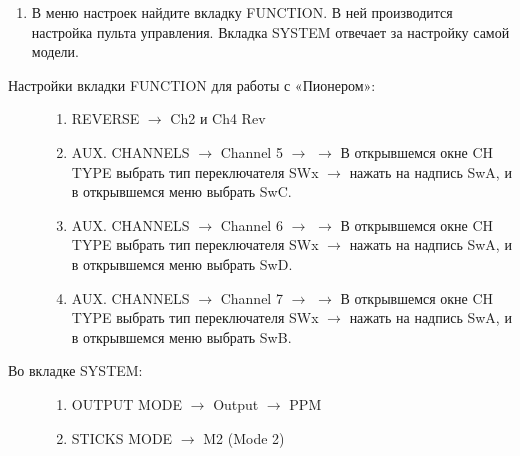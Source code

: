 \documentclass[a4paper,10pt,russian]{sphinxmanual}
\begin{document}
\noindent{}
\begin{enumerate}
\def\theenumi{\arabic{enumi}}
\def\labelenumi{\theenumi .}
\makeatletter\def\p@enumii{\p@enumi \theenumi .}\makeatother
\setcounter{enumi}{3}
\item {} 
В меню настроек найдите вкладку FUNCTION. В ней производится настройка пульта управления. Вкладка SYSTEM отвечает за настройку самой модели.

\end{enumerate}
\begin{description}
\item[{Настройки вкладки FUNCTION для работы с «Пионером»:}] \leavevmode\begin{enumerate}
\def\theenumi{\arabic{enumi}}
\def\labelenumi{\theenumi .}
\makeatletter\def\p@enumii{\p@enumi \theenumi .}\makeatother
\item {} 
REVERSE \(\rightarrow\) Ch2 и Ch4 \textendash{}Rev

\item {} 
AUX. CHANNELS \(\rightarrow\) Channel 5 \(\rightarrow\) \(\rightarrow\) В открывшемся окне CH TYPE выбрать тип переключателя SWx \(\rightarrow\) нажать на надпись SwA, и в открывшемся меню выбрать SwC.

\item {} 
AUX. CHANNELS \(\rightarrow\) Channel 6 \(\rightarrow\) \(\rightarrow\) В открывшемся окне CH TYPE выбрать тип переключателя SWx \(\rightarrow\) нажать на надпись SwA, и в открывшемся меню выбрать SwD.

\item {} 
AUX. CHANNELS \(\rightarrow\) Channel 7 \(\rightarrow\) \(\rightarrow\) В открывшемся окне CH TYPE выбрать тип переключателя SWx \(\rightarrow\) нажать на надпись SwA, и в открывшемся меню выбрать SwB.

\end{enumerate}

\item[{Во вкладке SYSTEM:}] \leavevmode\begin{enumerate}
\def\theenumi{\arabic{enumi}}
\def\labelenumi{\theenumi .}
\makeatletter\def\p@enumii{\p@enumi \theenumi .}\makeatother
\setcounter{enumi}{4}
\item {} 
OUTPUT MODE \(\rightarrow\) Output \(\rightarrow\) PPM

\item {} 
STICKS MODE \(\rightarrow\) M2 (Mode 2)

\end{enumerate}

\end{description}
\end{document}
